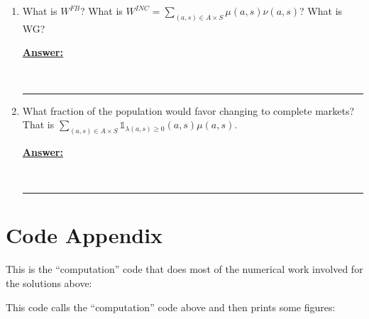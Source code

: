 \documentclass{article} %
\newcommand{\ifn}{\mathds{1}}
\theoremstyle{definition}
\newenvironment{solution}[1][Answer]{\begin{singlespace}\underline{\textbf{#1:}}\quad }{\ \rule{0.3em}{0.3em}\end{singlespace}} %
\begin{document}
\begin{enumerate}[I.]
\begin{enumerate}
\begin{solution}
			\end{solution}
			\item What is $ W^{FB} $? What is $ W^{INC}  = \sum_{(a,s) \in A \times S} \mu(a,s) \nu(a,s) $? What is WG?
			\begin{solution}

			\end{solution}
			\item What fraction of the population would favor changing to complete markets? That is $   \sum_{(a,s) \in A \times S}   \ifn_{\lambda(a,s) \geq 0}  (a,s) \mu(a,s) $.
			\begin{solution}

			\end{solution}
		\end{enumerate}
	\end{enumerate}
\section*{Code Appendix}
This is the ``computation'' code that does most of the numerical work involved for the solutions above:

This code calls the ``computation'' code above and then prints some figures:
\end{document}
